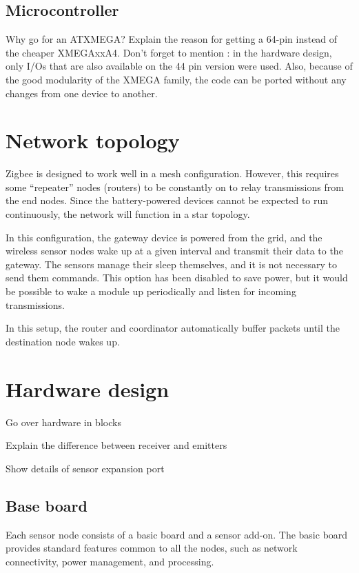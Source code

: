 \subsection{Microcontroller}
Why go for an ATXMEGA?
Explain the reason for getting a 64-pin instead of the cheaper XMEGAxxA4.
Don't forget to mention : in the hardware design, only I/Os that are also
available on the 44 pin version were used. Also, because of the good modularity
of the XMEGA family, the code can be ported without any changes from one device
to another.

\section{Network topology}

Zigbee is designed to work well in a mesh configuration. However, this requires
some ``repeater'' nodes (routers) to be constantly on to relay transmissions
from the end nodes. Since the battery-powered devices cannot be expected to run
continuously, the network will function in a star topology.

In this configuration, the gateway device is powered from the grid, and the
wireless sensor nodes wake up at a given interval and transmit their data to the
gateway. The sensors manage their sleep themselves, and it is not necessary to
send them commands. This option has been disabled to save power, but it would be
possible to wake a module up periodically and listen for incoming transmissions.

In this setup, the router and coordinator automatically buffer packets until the
destination node wakes up.

\section{Hardware design}

Go over hardware in blocks

Explain the difference between receiver and emitters

Show details of sensor expansion port

\subsection{Base board}

Each sensor node consists of a basic board and a sensor add-on. The basic board
provides standard features common to all the nodes, such as network
connectivity, power management, and processing.

